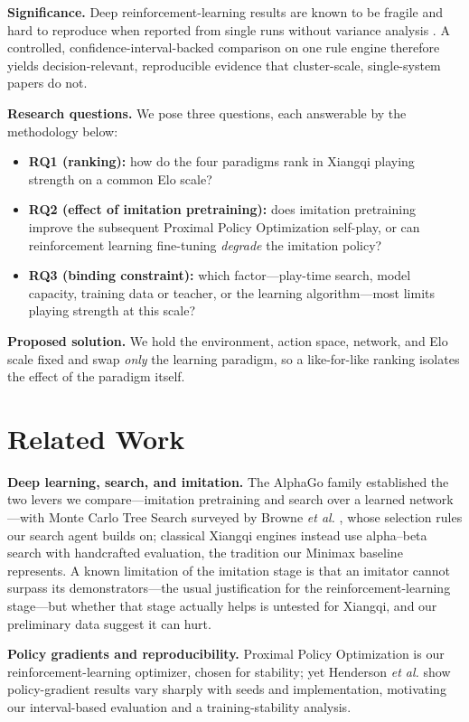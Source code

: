 \documentclass[conference]{IEEEtran}
\begin{document}
\textbf{Significance.} Deep reinforcement-learning results are known to be fragile
and hard to reproduce when reported from single runs without variance analysis
\cite{henderson2018}. A controlled, confidence-interval-backed comparison on one
rule engine therefore yields decision-relevant, reproducible evidence that
cluster-scale, single-system papers do not.

\textbf{Research questions.} We pose three questions, each answerable by the
methodology below:
\begin{itemize}
\item \textbf{RQ1 (ranking):} how do the four
paradigms rank in Xiangqi playing strength on a common Elo scale?
\item \textbf{RQ2 (effect of imitation pretraining):} does imitation pretraining
improve the subsequent Proximal Policy Optimization self-play,
or can reinforcement learning fine-tuning \emph{degrade} the imitation policy?
\item \textbf{RQ3 (binding constraint):} which factor---play-time search, model
capacity, training data or teacher, or the learning algorithm---most limits
playing strength at this scale?
\end{itemize}

\textbf{Proposed solution.} We hold the environment, action space, network, and
Elo scale fixed and swap \emph{only} the learning paradigm, so a like-for-like
ranking isolates the effect of the paradigm itself.

\section{Related Work}
\textbf{Deep learning, search, and imitation.} The AlphaGo family established the
two levers we compare---imitation pretraining and search over a learned network
\cite{silver2016,silver2017,silver2018}---with Monte Carlo Tree Search surveyed by
Browne \textit{et al.} \cite{browne2012}, whose selection rules our search agent
builds on; classical Xiangqi engines instead use alpha--beta search with
handcrafted evaluation, the tradition our Minimax baseline represents. A known
limitation of the imitation stage is that an imitator cannot surpass its
demonstrators---the usual justification for the reinforcement-learning stage---but
whether that stage actually helps is untested for Xiangqi, and
our preliminary data suggest it can hurt.

\textbf{Policy gradients and reproducibility.} Proximal Policy Optimization
\cite{schulman2017} is our reinforcement-learning optimizer, chosen for stability;
yet Henderson \textit{et al.} \cite{henderson2018} show policy-gradient results
vary sharply with seeds and implementation, motivating our interval-based
evaluation and a training-stability analysis.
\end{document}

